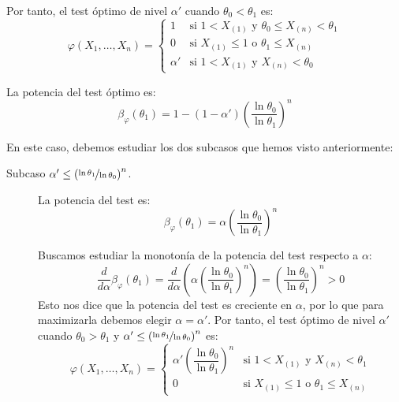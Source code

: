 \begin{ejercicio}
\begin{description}
        Por tanto, el test óptimo de nivel $\alpha'$ cuando $\theta_0 < \theta_1$ es:
        \begin{equation*}
            \varphi(X_1, \ldots, X_n) = \left\{\begin{array}{ll}
                1 & \text{si\ } 1 < X_{(1)} \text{\ y\ } \theta_0 \leq X_{(n)} < \theta_1 \\
                0 & \text{si\ } X_{(1)} \leq 1 \text{\ o\ } \theta_1 \leq X_{(n)} \\
                \alpha' & \text{si\ } 1 < X_{(1)} \text{\ y\ } X_{(n)} < \theta_0
            \end{array}\right.
        \end{equation*}

        La potencia del test óptimo es:
        \begin{equation*}
            \beta_\varphi(\theta_1) = 1 - (1-\alpha')\left(\frac{\ln \theta_0}{\ln \theta_1}\right)^n
        \end{equation*}

        \item[Caso $\theta_0 > \theta_1$.] En este caso, debemos estudiar los dos subcasos que hemos visto anteriormente:
        \begin{description}
            \item[Subcaso $\alpha' \leq \left(\nicefrac{\ln \theta_1}{\ln \theta_0}\right)^n$.] La potencia del test es:
            \begin{equation*}
                \beta_\varphi(\theta_1) = \alpha\left(\frac{\ln \theta_0}{\ln \theta_1}\right)^n
            \end{equation*}

            Buscamos estudiar la monotonía de la potencia del test respecto a $\alpha$:
            \begin{equation*}
                \frac{d}{d\alpha}\beta_\varphi(\theta_1) = \frac{d}{d\alpha}\left(\alpha\left(\frac{\ln \theta_0}{\ln \theta_1}\right)^n\right) = \left(\frac{\ln \theta_0}{\ln \theta_1}\right)^n > 0
            \end{equation*}
            Esto nos dice que la potencia del test es creciente en $\alpha$, por lo que para maximizarla debemos elegir $\alpha = \alpha'$. Por tanto, el test óptimo de nivel $\alpha'$ cuando $\theta_0 > \theta_1$ y $\alpha' \leq \left(\nicefrac{\ln \theta_1}{\ln \theta_0}\right)^n$ es:
            \begin{equation*}
                \varphi(X_1, \ldots, X_n) = \left\{\begin{array}{ll}
                    \alpha'\left(\dfrac{\ln \theta_0}{\ln \theta_1}\right)^n & \text{si\ } 1 < X_{(1)} \text{\ y\ } X_{(n)} < \theta_1 \\[8pt]
                    0 & \text{si\ } X_{(1)} \leq 1 \text{\ o\ } \theta_1 \leq X_{(n)}
                \end{array}\right.
            \end{equation*}


\end{description}
\end{description}
\end{ejercicio}
